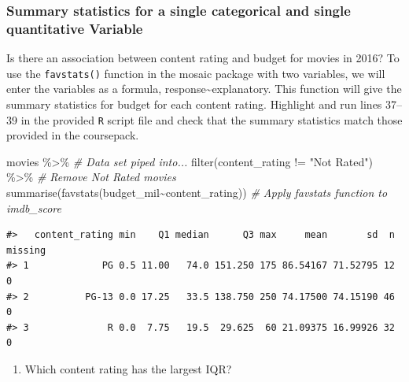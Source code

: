 \documentclass[
]{report}
\newenvironment{Shaded}{\begin{snugshade}}{\end{snugshade}}
\newcommand{\CommentTok}[1]{\textcolor[rgb]{0.56,0.35,0.01}{\textit{#1}}}
\newcommand{\FunctionTok}[1]{\textcolor[rgb]{0.00,0.00,0.00}{#1}}
\newcommand{\NormalTok}[1]{#1}
\newcommand{\SpecialCharTok}[1]{\textcolor[rgb]{0.00,0.00,0.00}{#1}}
\newcommand{\StringTok}[1]{\textcolor[rgb]{0.31,0.60,0.02}{#1}}
\providecommand{\tightlist}{%
  \setlength{\itemsep}{0pt}\setlength{\parskip}{0pt}}
\begin{document}
\hypertarget{summary-statistics-for-a-single-categorical-and-single-quantitative-variable}{%
\subsubsection*{Summary statistics for a single categorical and single quantitative Variable}\label{summary-statistics-for-a-single-categorical-and-single-quantitative-variable}}

Is there an association between content rating and budget for movies in 2016? To use the \texttt{favstats()} function in the mosaic package with two variables, we will enter the variables as a formula, response\textasciitilde explanatory. This function will give the summary statistics for budget for each content rating. Highlight and run lines 37--39 in the provided \texttt{R} script file and check that the summary statistics match those provided in the coursepack.

\begin{Shaded}
\begin{Highlighting}[]
\NormalTok{movies }\SpecialCharTok{\%\textgreater{}\%} \CommentTok{\# Data set piped into...}
  \FunctionTok{filter}\NormalTok{(content\_rating }\SpecialCharTok{!=} \StringTok{"Not Rated"}\NormalTok{) }\SpecialCharTok{\%\textgreater{}\%} \CommentTok{\# Remove Not Rated movies}
  \FunctionTok{summarise}\NormalTok{(}\FunctionTok{favstats}\NormalTok{(budget\_mil}\SpecialCharTok{\textasciitilde{}}\NormalTok{content\_rating)) }\CommentTok{\# Apply favstats function to imdb\_score}
\end{Highlighting}
\end{Shaded}

\begin{verbatim}
#>   content_rating min    Q1 median      Q3 max     mean       sd  n missing
#> 1             PG 0.5 11.00   74.0 151.250 175 86.54167 71.52795 12       0
#> 2          PG-13 0.0 17.25   33.5 138.750 250 74.17500 74.15190 46       0
#> 3              R 0.0  7.75   19.5  29.625  60 21.09375 16.99926 32       0
\end{verbatim}

\begin{enumerate}
\def\labelenumi{\arabic{enumi}.}
\setcounter{enumi}{10}
\tightlist
\item
  Which content rating has the largest IQR?
\end{enumerate}
\end{document}

